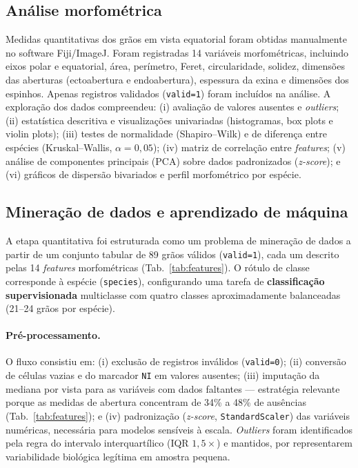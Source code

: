 \documentclass[pdflatex,sn-mathphys-num]{sn-jnl}
\begin{document}
\subsection{Análise morfométrica}\label{subsec:morfometria}

Medidas quantitativas dos grãos em vista equatorial foram obtidas manualmente no software Fiji/ImageJ. Foram registradas 14 variáveis morfométricas, incluindo eixos polar e equatorial, área, perímetro, Feret, circularidade, solidez, dimensões das aberturas (ectoabertura e endoabertura), espessura da exina e dimensões dos espinhos. Apenas registros validados (\texttt{valid=1}) foram incluídos na análise. A exploração dos dados compreendeu: (i) avaliação de valores ausentes e \textit{outliers}; (ii) estatística descritiva e visualizações univariadas (histogramas, box plots e violin plots); (iii) testes de normalidade (Shapiro--Wilk) e de diferença entre espécies (Kruskal--Wallis, $\alpha = 0{,}05$); (iv) matriz de correlação entre \textit{features}; (v) análise de componentes principais (PCA) sobre dados padronizados (\textit{z-score}); e (vi) gráficos de dispersão bivariados e perfil morfométrico por espécie.

\subsection{Mineração de dados e aprendizado de máquina}\label{subsec:mineracao}

A etapa quantitativa foi estruturada como um problema de mineração de dados a partir de um conjunto tabular de 89 grãos válidos (\texttt{valid=1}), cada um descrito pelas 14 \textit{features} morfométricas (Tab.~\ref{tab:features}). O rótulo de classe corresponde à espécie (\texttt{species}), configurando uma tarefa de \textbf{classificação supervisionada} multiclasse com quatro classes aproximadamente balanceadas (21--24 grãos por espécie).

\paragraph{Pré-processamento.} O fluxo consistiu em: (i) exclusão de registros inválidos (\texttt{valid=0}); (ii) conversão de células vazias e do marcador \texttt{NI} em valores ausentes; (iii) imputação da mediana por vista para as variáveis com dados faltantes --- estratégia relevante porque as medidas de abertura concentram de 34\% a 48\% de ausências (Tab.~\ref{tab:features}); e (iv) padronização (\textit{z-score}, \texttt{StandardScaler}) das variáveis numéricas, necessária para modelos sensíveis à escala. \textit{Outliers} foram identificados pela regra do intervalo interquartílico (IQR $1{,}5\times$) e mantidos, por representarem variabilidade biológica legítima em amostra pequena.
\end{document}
